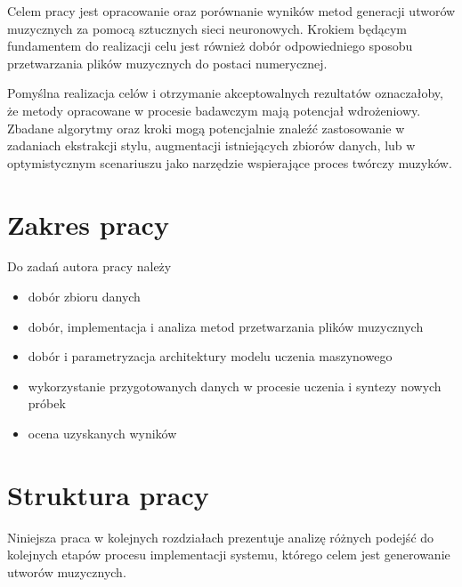 {{        Celem pracy jest opracowanie oraz porównanie wyników metod generacji utworów muzycznych za pomocą
        sztucznych sieci neuronowych. Krokiem będącym fundamentem do realizacji celu jest również
        dobór odpowiedniego sposobu przetwarzania plików muzycznych do postaci numerycznej.
        
        
        Pomyślna realizacja celów i otrzymanie akceptowalnych rezultatów oznaczałoby, że
        metody opracowane w procesie badawczym mają potencjał wdrożeniowy. 
        Zbadane algorytmy oraz kroki mogą potencjalnie znaleźć zastosowanie
        w zadaniach ekstrakcji stylu, augmentacji istniejących zbiorów danych,
        lub w optymistycznym scenariuszu jako narzędzie wspierające proces twórczy muzyków.
    }

    \section{Zakres pracy}
    {
        Do zadań autora pracy należy
        \begin{itemize}
            \setlength\itemsep{-0.5em}
            \item dobór zbioru danych
            \item dobór, implementacja i analiza metod przetwarzania plików muzycznych
            \item dobór i parametryzacja architektury modelu uczenia maszynowego
            \item wykorzystanie przygotowanych danych 
            w procesie uczenia i syntezy nowych próbek
            \item ocena uzyskanych wyników
        \end{itemize}
    }

    \section{Struktura pracy}
    {
        Niniejsza praca w kolejnych rozdziałach prezentuje analizę różnych podejść do kolejnych etapów
        procesu implementacji systemu, którego celem jest generowanie utworów muzycznych. 

}}
